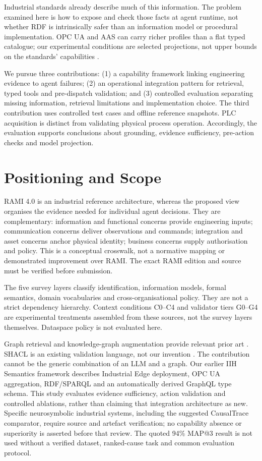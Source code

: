 \documentclass[10pt,journal,letterpaper]{IEEEtran}
\begin{document}
Industrial standards already describe much of this information. The problem
examined here is how to expose and check those facts at agent runtime, not whether
RDF is intrinsically safer than an information model or procedural implementation.
OPC UA and AAS can carry richer profiles than a flat typed catalogue; our
experimental conditions are selected projections, not upper bounds on the
standards' capabilities \cite{iec62541,idta2023aas}.

We pursue three contributions: (1) a capability framework linking engineering
evidence to agent failures; (2) an operational integration pattern for retrieval,
typed tools and pre-dispatch validation; and (3) controlled evaluation separating
missing information, retrieval limitations and implementation choice. The third
contribution uses controlled test cases and offline reference snapshots. PLC
acquisition is distinct from validating physical process operation. Accordingly,
the evaluation supports conclusions about grounding, evidence sufficiency,
pre-action checks and model projection.

\section{Positioning and Scope}
RAMI 4.0 is an industrial reference architecture, whereas the proposed view
organises the evidence needed for individual agent decisions. They are
complementary: information and functional concerns provide engineering inputs;
communication concerns deliver observations and commands; integration and asset
concerns anchor physical identity; business concerns supply authorisation and
policy. This is a conceptual crosswalk, not a normative mapping or demonstrated
improvement over RAMI. The exact RAMI edition and source must be verified before
submission.

The five survey layers classify identification, information models, formal
semantics, domain vocabularies and cross-organisational policy. They are not a
strict dependency hierarchy. Context conditions C0--C4 and validator tiers
G0--G4 are experimental treatments assembled from these sources, not the survey
layers themselves. Dataspace policy is not evaluated here.

Graph retrieval and knowledge-graph augmentation provide relevant prior art
\cite{edge2024graphrag,pan2024unifying}. SHACL is an existing validation language,
not our invention \cite{knublauch2017shacl}. The contribution cannot be the
generic combination of an LLM and a graph. Our earlier IIH Semantics framework
\cite{todkar2025semanticitot} describes Industrial Edge deployment, OPC UA aggregation, RDF/SPARQL
and an automatically derived GraphQL type schema. This study evaluates evidence
sufficiency, action validation and controlled ablations, rather than claiming
that integration architecture as new. Specific neurosymbolic industrial
systems, including the suggested CausalTrace comparator, require source and
artefact verification; no capability absence or superiority is asserted before
that review. The quoted 94\% MAP@3 result is not used without a verified dataset,
ranked-cause task and common evaluation protocol.
\end{document}
